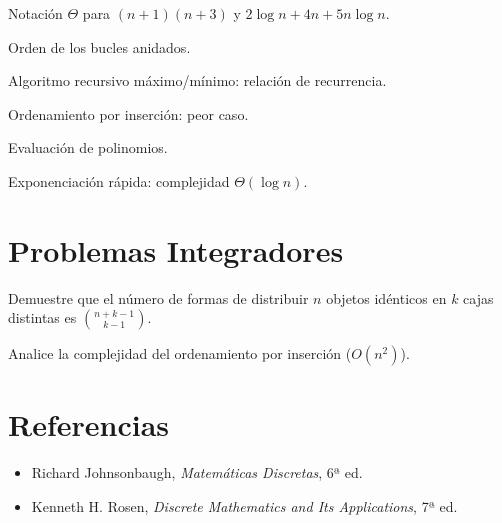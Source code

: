\begin{ejercicio}
Notación $\Theta$ para $(n+1)(n+3)$ y $2\log n + 4n + 5n\log n$.
\end{ejercicio}

\begin{ejercicio}
Orden de los bucles anidados.
\end{ejercicio}

\begin{ejercicio}
Algoritmo recursivo máximo/mínimo: relación de recurrencia.
\end{ejercicio}

\begin{ejercicio}
Ordenamiento por inserción: peor caso.
\end{ejercicio}

\begin{ejercicio}
Evaluación de polinomios.
\end{ejercicio}

\begin{ejercicio}
Exponenciación rápida: complejidad $\Theta(\log n)$.
\end{ejercicio}

\section{Problemas Integradores}
\begin{ejercicio}
Demuestre que el número de formas de distribuir $n$ objetos idénticos en $k$ cajas distintas es $\binom{n+k-1}{k-1}$.
\end{ejercicio}

\begin{ejercicio}
Analice la complejidad del ordenamiento por inserción ($O(n^2)$).
\end{ejercicio}

\section{Referencias}
\begin{itemize}
  \item Richard Johnsonbaugh, \emph{Matemáticas Discretas}, 6ª ed.
  \item Kenneth H. Rosen, \emph{Discrete Mathematics and Its Applications}, 7ª ed.
\end{itemize}